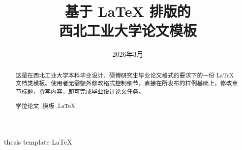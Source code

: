 \documentclass[lang=chs, degree=master, blindreview=false, adobe=false, academic=true]{yanputhesis}
\title{基于 LaTeX 排版的 \\ 西北工业大学论文模板}{          %
    Yet Another Thesis Template of \\ Northwestern Polytechnical University
}                                                           %
\author{\blindreview{张三丰}}{\blindreview{Sanfeng Zhang}}  %
\date{2026年3月}{March/2026}                              %
\begin{document}
\frontmatter                                                %
\maketitle                                                  %


\begin{abstract}                                            %
    这是在西北工业大学本科毕业设计、硕博研究生毕业论文格式的要求下的一份 LaTeX
    文档类模板。使用者无需额外修改格式控制细节，直接在所发布的样例基础上，修改章
    节标题，撰写内容，即可完成毕业设计论文任务。            %
    \begin{keywords}                                        %
        学位论文 \sep 模板 \sep \LaTeX                      %
    \end{keywords}                                          %
\end{abstract}                                              %

\begin{engabstract}                                         %
    \noindent \blindtext                                    %
    \begin{engkeywords}                                     %
        thesis \ensep template \ensep \LaTeX                %
    \end{engkeywords}                                       %
\end{engabstract}                                           %
\end{document}
